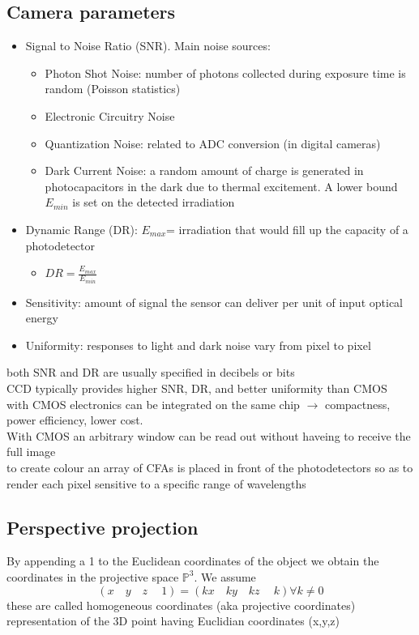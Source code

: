 \documentclass{article}
\begin{document}
\subsection{Camera parameters}
\begin{itemize}
	\item Signal to Noise Ratio (SNR). Main noise sources: \begin{itemize}
		\item Photon Shot Noise: number of photons collected during exposure time is random (Poisson statistics)
		\item Electronic Circuitry Noise
		\item Quantization Noise: related to ADC conversion (in digital cameras)
		\item Dark Current Noise: a random amount of charge is generated in photocapacitors in the dark due to thermal excitement. A lower bound $E_{min}$ is set on the detected irradiation
	\end{itemize}
	\item Dynamic Range (DR): $E_{max}$= irradiation that would fill up the capacity of a photodetector \begin{itemize}
		\item $DR=\frac{E_{max}}{E_{min}}$
		\end{itemize}
	\item Sensitivity: amount of signal the sensor can deliver per unit of input optical energy
	\item Uniformity: responses to light and dark noise vary from pixel to pixel
\end{itemize}
both SNR and DR are usually specified in decibels or bits\\
CCD typically provides higher SNR, DR, and better uniformity than CMOS\\
with CMOS electronics can be integrated on the same chip $\rightarrow$ compactness, power efficiency, lower cost.\\
With CMOS an arbitrary window can be read out without haveing to receive the full image\\
to create colour an array of CFAs is placed in front of the photodetectors so as to render each pixel sensitive to a specific range of wavelengths

\subsection{Perspective projection}
By appending a 1 to the Euclidean coordinates of the object we obtain the coordinates in the projective space $\mathbb{P}^3$. We assume
\begin{equation}
	(x \quad y \quad z \quad\ 1)=(kx \quad ky \quad kz \quad\ k) \forall k \neq 0
\end{equation}
these are called homogeneous coordinates (aka projective coordinates) representation of the 3D point having Euclidian coordinates (x,y,z)
\end{document}

